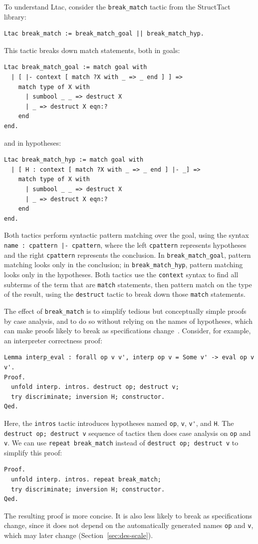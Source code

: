 To understand Ltac, consider the \lstinline{break_match} tactic from the StructTact~\citep{structtact} library:
\begin{lstlisting}
Ltac break_match := break_match_goal || break_match_hyp.
\end{lstlisting}
This tactic breaks down match statements, both in goals:
\begin{lstlisting}
Ltac break_match_goal := match goal with
  | [ |- context [ match ?X with _ => _ end ] ] =>
    match type of X with
      | sumbool _ _ => destruct X
      | _ => destruct X eqn:?
    end
end.
\end{lstlisting}
and in hypotheses:
\begin{lstlisting}
Ltac break_match_hyp := match goal with
  | [ H : context [ match ?X with _ => _ end ] |- _] =>
    match type of X with
      | sumbool _ _ => destruct X
      | _ => destruct X eqn:?
    end
end.
\end{lstlisting}
Both tactics perform syntactic pattern matching
over the goal, using the syntax \lstinline{name : cpattern |- cpattern}, where the 
left \lstinline{cpattern} represents hypotheses and the right \lstinline{cpattern} represents the conclusion.
In \lstinline{break_match_goal}, pattern matching looks only in the conclusion;
in \lstinline{break_match_hyp}, pattern matching looks only in the hypotheses.
Both tactics use the \lstinline{context} syntax to find all subterms of the term that are \lstinline{match} statements,
then pattern match on the type of the result, using the \lstinline{destruct} tactic to break down those \lstinline{match} statements.

The effect of \lstinline{break_match} is to simplify tedious but conceptually simple proofs by case analysis,
and to do so without relying on the names of hypotheses, which can make proofs likely to break as specifications change~\citep{Woos2016}. 
Consider, for example, an interpreter correctness proof:
\begin{lstlisting}
Lemma interp_eval : forall op v v', interp op v = Some v' -> eval op v v'.
Proof.
  unfold interp. intros. destruct op; destruct v; 
  try discriminate; inversion H; constructor.
Qed.
\end{lstlisting}
Here, the \lstinline{intros} tactic introduces hypotheses named \lstinline{op}, \lstinline{v}, \lstinline{v'}, and \lstinline{H}.
The \lstinline{destruct op; destruct v} sequence of tactics then does case analysis on \lstinline{op} and \lstinline{v}.
We can use \lstinline{repeat break_match} instead of \lstinline{destruct op; destruct v} to simplify this proof:
\begin{lstlisting}
Proof.
  unfold interp. intros. repeat break_match;
  try discriminate; inversion H; constructor.
Qed.
\end{lstlisting}
The resulting proof is more concise. It is also less likely to break as specifications change,
since it does not depend on the automatically generated names \lstinline{op} and \lstinline{v}, which may later change
(Section~\ref{sec:des-scale}).

